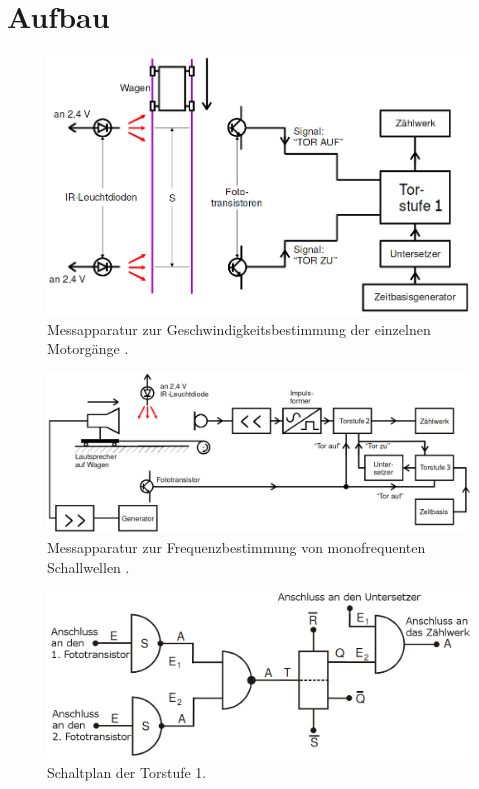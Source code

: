 \section{Aufbau}
\label{sec:Aufbau}
\begin{figure}
	\centering
	\includegraphics[width=\linewidth-50pt,height=\textheight-50pt,keepaspectratio]{content/Bilder/Geschwindigkeitsmessung.png}
	\caption{Messapparatur zur Geschwindigkeitsbestimmung der einzelnen Motorgänge \cite{V104}.}
	\label{fig:Aufbau}
\end{figure}
\begin{figure}
	\centering
	\includegraphics[width=\linewidth-50pt,height=\textheight-50pt,keepaspectratio]{content/Bilder/Frequenzmessung.png}
	\caption{Messapparatur zur Frequenzbestimmung von monofrequenten Schallwellen \cite{V104}.}
	\label{fig:Aufbau2}
\end{figure}
\begin{figure}
	\centering
	\includegraphics[width=\linewidth-50pt,height=\textheight-50pt,keepaspectratio]{content/Bilder/Torstufe1.png}
	\caption{Schaltplan der Torstufe 1.}
	\label{fig:Aufbasteve}
\end{figure}
